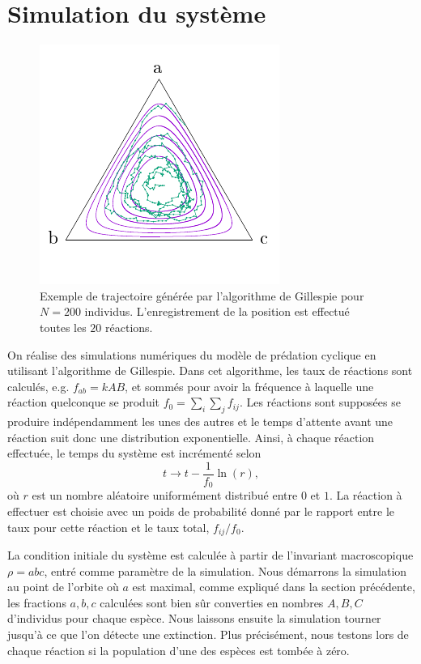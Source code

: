 \documentclass[openany,a4paper,12pt]{article}
\begin{document}
\section{Simulation du système}
\label{section_simulation}

\begin{figure}[t]
	\centering
	\includegraphics[width=0.7\linewidth]{figures/portrait_trajectory}
	\caption{Exemple de trajectoire générée par l'algorithme de Gillespie pour $N=200$ individus. L'enregistrement de la position est effectué toutes les $20$ réactions.}
	\label{fig:portrait_trajectoire}
\end{figure}

\par On réalise des simulations numériques du modèle de prédation cyclique en utilisant l'algorithme de Gillespie. Dans cet algorithme, les taux de réactions sont calculés, e.g. $f_{ab} = k AB$, et sommés pour avoir la fréquence à laquelle une réaction quelconque se produit $f_0 = \sum_i\sum_j f_{ij}$. Les réactions sont supposées se produire indépendamment les unes des autres et le temps d'attente avant une réaction suit donc une distribution exponentielle. Ainsi, à chaque réaction effectuée, le temps du système est incrémenté selon
%
\begin{equation}\label{gillespie_incr_temps}
	t \rightarrow t - \frac{1}{f_0} \ln(r),
\end{equation}
%
où $r$ est un nombre aléatoire uniformément distribué entre $0$ et $1$.
La réaction à effectuer est choisie avec un poids de probabilité donné par le rapport entre le taux pour cette réaction et le taux total, $f_{ij}/f_0$.

\par La condition initiale du système est calculée à partir de l'invariant macroscopique $\rho=abc$, entré comme paramètre de la simulation. Nous démarrons la simulation au point de l'orbite où $a$ est maximal, comme expliqué dans la section précédente, les fractions $a,b,c$ calculées sont bien sûr converties en nombres $A,B,C$ d'individus pour chaque espèce. Nous laissons ensuite la simulation tourner jusqu'à ce que l'on détecte une extinction. Plus précisément, nous testons lors de chaque réaction si la population d'une des espèces est tombée à zéro.
\end{document}

